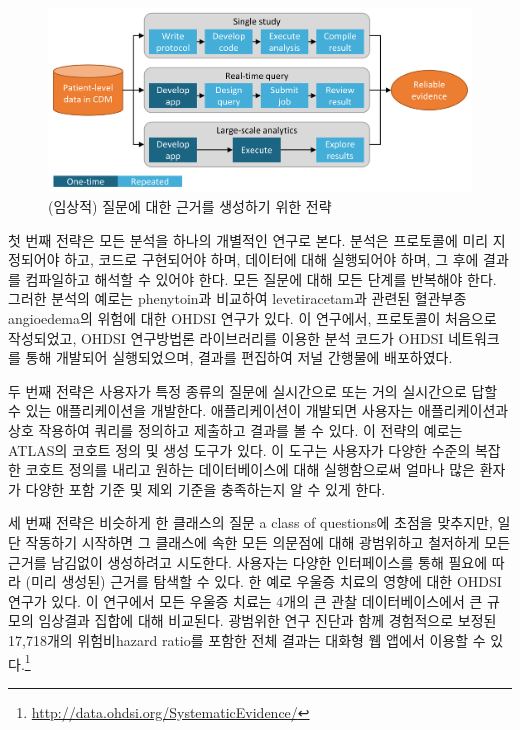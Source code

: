 \documentclass[10.5pt]{book}
\let\rmarkdownfootnote\footnote%
\def\footnote{\protect\rmarkdownfootnote}
\theoremstyle{definition}
\theoremstyle{definition}
\theoremstyle{definition}
\theoremstyle{remark}
\begin{document}
\begin{figure}

{\centering \includegraphics[width=0.9\linewidth]{images/OhdsiAnalyticsTools/strategies} 

}

\caption{(임상적) 질문에 대한 근거를 생성하기 위한 전략}\label{fig:strategies}
\end{figure}

첫 번째 전략은 모든 분석을 하나의 개별적인 연구로 본다. 분석은
프로토콜에 미리 지정되어야 하고, 코드로 구현되어야 하며, 데이터에 대해
실행되어야 하며, 그 후에 결과를 컴파일하고 해석할 수 있어야 한다. 모든
질문에 대해 모든 단계를 반복해야 한다. 그러한 분석의 예로는 phenytoin과
비교하여 levetiracetam과 관련된 혈관부종angioedema의 위험에 대한 OHDSI
연구가 있다. \citep{duke_2017} 이 연구에서, 프로토콜이 처음으로
작성되었고, OHDSI 연구방법론 라이브러리를 이용한 분석 코드가 OHDSI
네트워크를 통해 개발되어 실행되었으며, 결과를 편집하여 저널 간행물에
배포하였다.

두 번째 전략은 사용자가 특정 종류의 질문에 실시간으로 또는 거의
실시간으로 답할 수 있는 애플리케이션을 개발한다. 애플리케이션이 개발되면
사용자는 애플리케이션과 상호 작용하여 쿼리를 정의하고 제출하고 결과를 볼
수 있다. 이 전략의 예로는 ATLAS의 코호트 정의 및 생성 도구가 있다. 이
도구는 사용자가 다양한 수준의 복잡한 코호트 정의를 내리고 원하는
데이터베이스에 대해 실행함으로써 얼마나 많은 환자가 다양한 포함 기준 및
제외 기준을 충족하는지 알 수 있게 한다.

세 번째 전략은 비슷하게 한 클래스의 질문 a class of questions에 초점을
맞추지만, 일단 작동하기 시작하면 그 클래스에 속한 모든 의문점에 대해
광범위하고 철저하게 모든 근거를 남김없이 생성하려고 시도한다. 사용자는
다양한 인터페이스를 통해 필요에 따라 (미리 생성된) 근거를 탐색할 수
있다. 한 예로 우울증 치료의 영향에 대한 OHDSI 연구가 있다.
\citep{schuemie_2018b} 이 연구에서 모든 우울증 치료는 4개의 큰 관찰
데이터베이스에서 큰 규모의 임상결과 집합에 대해 비교된다. 광범위한 연구
진단과 함께 경험적으로 보정된 17,718개의 위험비hazard ratio를 포함한
전체 결과는 대화형 웹 앱에서 이용할 수 있다.\footnote{\url{http://data.ohdsi.org/SystematicEvidence/}}
\end{document}
